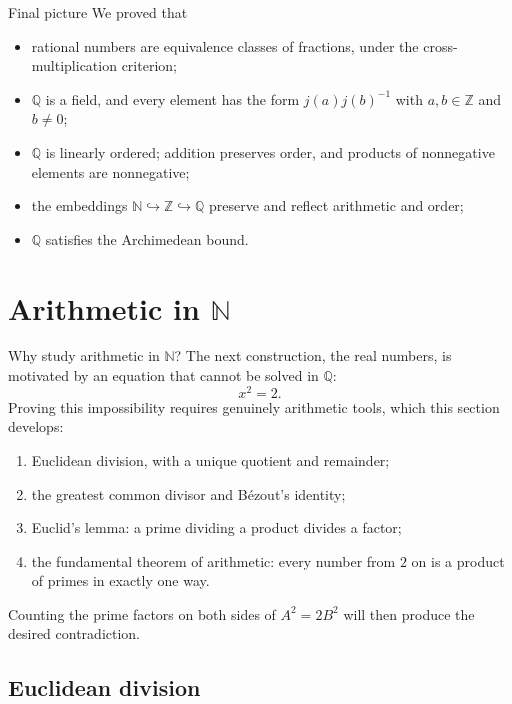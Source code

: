 \documentclass[aspectratio=169,11pt]{beamer}
\newcommand{\N}{\mathbb N}
\newcommand{\Z}{\mathbb Z}
\newcommand{\Q}{\mathbb Q}
\begin{document}
\begin{frame}{Final picture}
  We proved that
  \begin{itemize}
    \item rational numbers are equivalence classes of fractions, under the
      cross-multiplication criterion;
    \item \(\Q\) is a field, and every element has the form
      \(j(a)j(b)^{-1}\) with \(a,b\in\Z\) and \(b\ne0\);
    \item \(\Q\) is linearly ordered; addition preserves order, and products
      of nonnegative elements are nonnegative;
    \item the embeddings \(\N\hookrightarrow\Z\hookrightarrow\Q\) preserve
      and reflect arithmetic and order;
    \item \(\Q\) satisfies the Archimedean bound.
  \end{itemize}
\end{frame}

\section{\texorpdfstring{Arithmetic in \(\N\)}{Arithmetic in N}}

\begin{frame}{Why study arithmetic in \(\N\)?}
  The next construction, the real numbers, is motivated by an equation that
  cannot be solved in \(\Q\):
  \[
    x^2=2.
  \]
  Proving this impossibility requires genuinely arithmetic tools, which this
  section develops:
  \begin{enumerate}
    \item \alert{Euclidean division}, with a unique quotient and remainder;
    \item the \alert{greatest common divisor} and Bézout's identity;
    \item \alert{Euclid's lemma}: a prime dividing a product divides a factor;
    \item the \alert{fundamental theorem of arithmetic}: every number from
      \(2\) on is a product of primes in exactly one way.
  \end{enumerate}
  Counting the prime factors on both sides of \(A^2=2B^2\) will then produce
  the desired contradiction.
\end{frame}

\subsection{Euclidean division}
\end{document}
